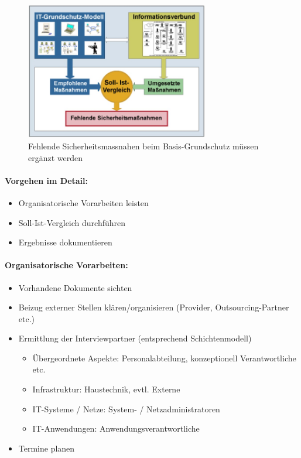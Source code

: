\documentclass[10pt,a4paper]{article}
\begin{document}
\begin{figure}[H]
    \begin{center}
    \includegraphics[width=8cm]{images/Grundschutz basis.png}
    \caption{Fehlende Sicherheitsmassnahen beim Basis-Grundschutz müssen ergänzt werden}
    \label{grundschutzbasis}
    \end{center}
\end{figure}



\paragraph*{Vorgehen im Detail:}
\begin{itemize}[noitemsep,topsep=0pt,leftmargin=*]
    \item Organisatorische Vorarbeiten leisten
    \item Soll-Ist-Vergleich durchführen
    \item Ergebnisse dokumentieren
\end{itemize}

\paragraph*{Organisatorische Vorarbeiten:}
\begin{itemize}[noitemsep,topsep=0pt,leftmargin=*]
    \item Vorhandene Dokumente sichten
    \item Beizug externer Stellen klären/organisieren (Provider, Outsourcing-Partner etc.)
    \item Ermittlung der Interviewpartner (entsprechend Schichtenmodell)
    \begin{itemize}[noitemsep,topsep=0pt,leftmargin=*]
        \item Übergeordnete Aspekte: Personalabteilung, konzeptionell Verantwortliche etc.
        \item Infrastruktur: Haustechnik, evtl. Externe
        \item IT-Systeme / Netze: System- / Netzadministratoren
        \item IT-Anwendungen: Anwendungsverantwortliche
    \end{itemize}
    \item Termine planen
\end{itemize}
\end{document}

